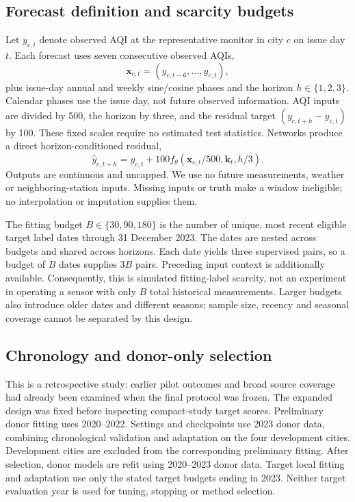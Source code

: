 \documentclass[conference]{IEEEtran}
\begin{document}
\subsection{Forecast definition and scarcity budgets}
Let $y_{c,t}$ denote observed AQI at the representative monitor in city $c$ on issue day $t$. Each forecast uses seven consecutive observed AQIs,
\begin{equation}
\mathbf{x}_{c,t}=(y_{c,t-6},\ldots,y_{c,t}),
\end{equation}
plus issue-day annual and weekly sine/cosine phases and the horizon $h\in\{1,2,3\}$. Calendar phases use the issue day, not future observed information. AQI inputs are divided by 500, the horizon by three, and the residual target $(y_{c,t+h}-y_{c,t})$ by 100. These fixed scales require no estimated test statistics. Networks produce a direct horizon-conditioned residual,
\begin{equation}
\widehat y_{c,t+h}=y_{c,t}+100f_\theta(\mathbf{x}_{c,t}/500,\mathbf{k}_{t},h/3).
\end{equation}
Outputs are continuous and uncapped. We use no future measurements, weather or neighboring-station inputs. Missing inputs or truth make a window ineligible; no interpolation or imputation supplies them.

The fitting budget $B\in\{30,90,180\}$ is the number of unique, most recent eligible target label dates through 31 December 2023. The dates are nested across budgets and shared across horizons. Each date yields three supervised pairs, so a budget of $B$ dates supplies $3B$ pairs. Preceding input context is additionally available. Consequently, this is simulated fitting-label scarcity, not an experiment in operating a sensor with only $B$ total historical measurements. Larger budgets also introduce older dates and different seasons; sample size, recency and seasonal coverage cannot be separated by this design.

\subsection{Chronology and donor-only selection}
This is a retrospective study: earlier pilot outcomes and broad source coverage had already been examined when the final protocol was frozen. The expanded design was fixed before inspecting compact-study target scores. Preliminary donor fitting uses 2020--2022. Settings and checkpoints use 2023 donor data, combining chronological validation and adaptation on the four development cities. Development cities are excluded from the corresponding preliminary fitting. After selection, donor models are refit using 2020--2023 donor data. Target local fitting and adaptation use only the stated target budgets ending in 2023. Neither target evaluation year is used for tuning, stopping or method selection.
\end{document}

